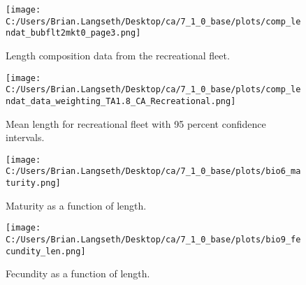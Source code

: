\documentclass[11pt,
  english,
  a4paper,
]{article}
\begin{document}
\tagmcend\tagstructend


\begin{figure}
\centering
\texttt{[image: C:/Users/Brian.Langseth/Desktop/ca/7\_1\_0\_base/plots/comp\_lendat\_bubflt2mkt0\_page3.png]}
\caption{Length composition data from the recreational fleet.\label{fig:rec-len-data}}
\end{figure}

\tagmcend\tagstructend


\begin{figure}
\centering
\texttt{[image: C:/Users/Brian.Langseth/Desktop/ca/7\_1\_0\_base/plots/comp\_lendat\_data\_weighting\_TA1.8\_CA\_Recreational.png]}
\caption{Mean length for recreational fleet with 95 percent confidence intervals.\label{fig:mean-rec-len-data}}
\end{figure}

\tagmcend\tagstructend


\begin{figure}
\centering
\texttt{[image: C:/Users/Brian.Langseth/Desktop/ca/7\_1\_0\_base/plots/bio6\_maturity.png]}
\caption{Maturity as a function of length.\label{fig:maturity}}
\end{figure}

\tagmcend\tagstructend


\begin{figure}
\centering
\texttt{[image: C:/Users/Brian.Langseth/Desktop/ca/7\_1\_0\_base/plots/bio9\_fecundity\_len.png]}
\caption{Fecundity as a function of length.\label{fig:fecundity}}
\end{figure}

\tagmcend\tagstructend

\end{document}
